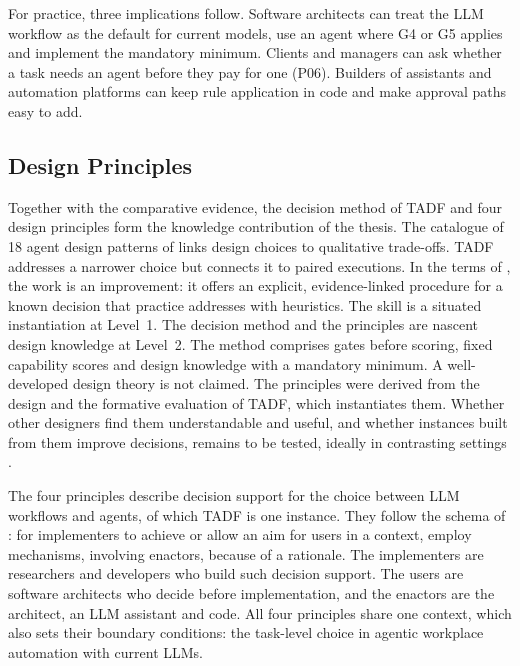 For practice, three implications follow. Software architects can treat the LLM workflow as the default for current models, use an agent where G4 or G5 applies and implement the mandatory minimum. Clients and managers can ask whether a task needs an agent before they pay for one (P06). Builders of assistants and automation platforms can keep rule application in code and make approval paths easy to add.

\subsection{Design Principles}
\label{subsec:discussion/contribution}

Together with the comparative evidence, the decision method of TADF and four design principles form the knowledge contribution of the thesis. The catalogue of 18 agent design patterns of \textcite{liuAgentDesignPattern2025} links design choices to qualitative trade-offs. TADF addresses a narrower choice but connects it to paired executions. In the terms of \textcite{gregorPositioningPresentingDesign2013}, the work is an improvement: it offers an explicit, evidence-linked procedure for a known decision that practice addresses with heuristics. The skill is a situated instantiation at Level~1. The decision method and the principles are nascent design knowledge at Level~2. The method comprises gates before scoring, fixed capability scores and design knowledge with a mandatory minimum. A well-developed design theory is not claimed. The principles were derived from the design and the formative evaluation of TADF, which instantiates them. Whether other designers find them understandable and useful, and whether instances built from them improve decisions, remains to be tested, ideally in contrasting settings \parencite{australiannationaluniversityaustraliaResearchPerspectivesAnatomy2020,seidelDesignPrinciplesSensemaking2018}.

 The four principles describe decision support for the choice between LLM workflows and agents, of which TADF is one instance. They follow the schema of \textcite{australiannationaluniversityaustraliaResearchPerspectivesAnatomy2020}: for implementers to achieve or allow an aim for users in a context, employ mechanisms, involving enactors, because of a rationale. The implementers are researchers and developers who build such decision support. The users are software architects who decide before implementation, and the enactors are the architect, an LLM assistant and code. All four principles share one context, which also sets their boundary conditions: the task-level choice in agentic workplace automation with current LLMs.

